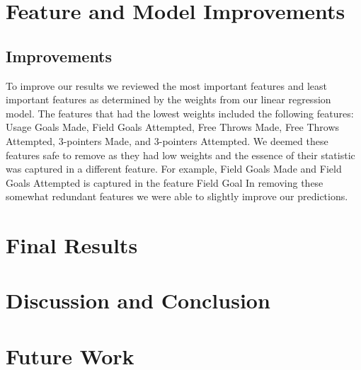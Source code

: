 \documentclass{article}
\begin{document}
\section{Feature and Model Improvements}
\subsection{Improvements}
To improve our results we reviewed the most important features and least important 
features as determined by the weights from our linear regression model. The features 
that had the lowest weights included the following features: Usage %
Goals Made, Field Goals Attempted, Free Throws Made, Free Throws Attempted, 3-pointers 
Made, and 3-pointers Attempted. We deemed these features safe to remove as they had 
low weights and the essence of their statistic was captured in a different feature. 
For example, Field Goals Made and Field Goals Attempted is captured in the feature 
Field Goal %
In removing these somewhat redundant features we were able to slightly 
improve our predictions. 


\section{Final Results}

\section{Discussion and Conclusion}

\section{Future Work}
\end{document}
